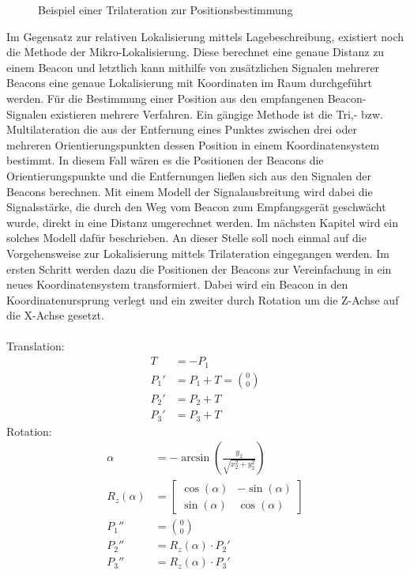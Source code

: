 \begin{figure}
\caption{Beispiel einer Trilateration zur Positionsbestimmung}
\label{fig:Trilat}
\end{figure}
Im Gegensatz zur relativen Lokalisierung mittels Lagebeschreibung, existiert noch die Methode der Mikro-Lokalisierung. Diese berechnet eine genaue Distanz zu einem Beacon und letztlich kann mithilfe von zusätzlichen Signalen mehrerer Beacons eine genaue Lokalisierung mit Koordinaten im Raum  durchgeführt werden. Für die Bestimmung einer Position aus den empfangenen Beacon-Signalen existieren mehrere Verfahren. Ein gängige Methode ist die Tri,- bzw. Multilateration die aus der Entfernung eines Punktes zwischen drei oder mehreren Orientierungspunkten dessen Position in einem Koordinatensystem bestimmt. In diesem Fall wären es die Positionen der Beacons die Orientierungspunkte und die Entfernungen ließen sich aus den Signalen der Beacons berechnen. Mit einem Modell der Signalausbreitung wird dabei die Signalsstärke, die durch den Weg vom Beacon zum Empfangsgerät geschwächt wurde, direkt in eine Distanz umgerechnet werden. Im nächsten Kapitel wird ein solches Modell dafür beschrieben. An dieser Stelle soll noch einmal auf die Vorgehensweise zur Lokalisierung mittels Trilateration eingegangen werden. Im ersten Schritt werden dazu die Positionen der Beacons zur Vereinfachung in ein neues Koordinatensystem transformiert. Dabei wird ein Beacon in den Koordinatenursprung verlegt und ein zweiter durch Rotation um die Z-Achse auf die X-Achse gesetzt.\\ \\
Translation:
\begin{align*}
T &= -P_1\\
P_1' &= P_1 + T = \binom{0}{0}\\
P_2' &= P_2 + T\\
P_3' &= P_3 + T
\end{align*} 
Rotation:
\begin{align*}
\alpha &= -\arcsin \left ( \frac{y_2}{\sqrt{x_2^2+y_2^2}} \right )\\
R_z\left ( \alpha \right ) &= \begin{bmatrix}
\cos\left ( \alpha \right ) & -\sin\left ( \alpha \right )\\ 
\sin\left ( \alpha \right ) & \cos\left ( \alpha \right )
\end{bmatrix}\\
P_1'' &= \binom{0}{0}\\
P_2'' &= R_z\left ( \alpha \right ) \cdot P_2'\\
P_3'' &= R_z\left ( \alpha \right ) \cdot P_3'
\end{align*}
